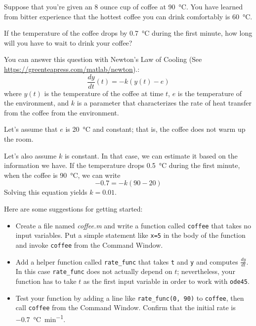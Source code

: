\begin{ex}


Suppose that you're given an 8 ounce cup of coffee at \SI{90}{\celsius}.
You have learned from bitter experience that the hottest coffee you
can drink comfortably is \SI{60}{\celsius}.  

If the temperature of the coffee drops by \SI{0.7}{\celsius} during the first minute, how long will you have to wait to drink your coffee?

You can answer this question with Newton's Law of Cooling (See \url{https://greenteapress.com/matlab/newton}).:
%
\begin{equation*}
\frac{dy}{dt}(t) = -k (y(t) - e)
\end{equation*}
%
where $y(t)$ is the temperature of the coffee at time $t$,
$e$ is the temperature of the environment, and $k$ is a parameter
that characterizes the rate of heat transfer from the coffee from the environment.

Let's assume that $e$ is \SI{20}{\celsius} and constant; that is, the coffee does not warm up the room.

Let's also assume $k$ is constant.  In that case, we can estimate it based on the information we have.  If the temperature drops \SI{0.5}{\celsius} during the first minute, when the coffee is \SI{90}{\celsius}, we can write
%
\begin{equation*}
-0.7 = -k (90 - 20)
\end{equation*}
%
Solving this equation yields $k = 0.01$.

Here are some suggestions for getting started:

\begin{itemize}

\item Create a file named {\em coffee.m} and write a function
called {\tt coffee} that takes no input variables.  Put a simple statement like {\tt x=5} in the body of the function and invoke {\tt coffee} from the Command Window.

\item Add a helper function called \verb"rate_func" that takes {\tt t} and {\tt y} and computes $\frac{dy}{dt}$.  In this case \verb"rate_func" does not actually depend on $t$; nevertheless, your function has to take $t$ as the first input variable in order to work with {\tt ode45}.

\item Test your function by adding a line like \verb"rate_func(0, 90)"
to {\tt coffee}, then call {\tt coffee} from the {\sf Command Window}.
Confirm that the initial rate is \SI{-0.7}{\celsius \per \minute}.


\end{itemize}
\end{ex}
